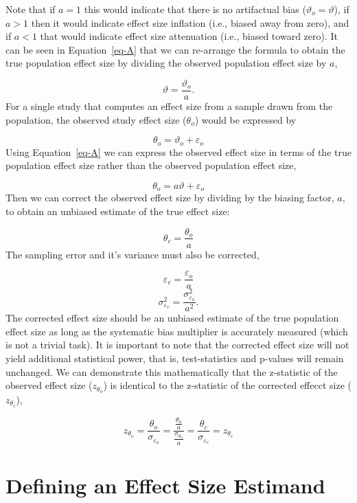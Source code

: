 \documentclass[
  letterpaper,
  DIV=11,
  numbers=noendperiod]{scrreprt}
\begin{document}
Note that if \(a=1\) this would indicate that there is no artifactual
bias (\(\vartheta_o=\vartheta\)), if \(a>1\) then it would indicate
effect size inflation (i.e., biased away from zero), and if \(a<1\) that
would indicate effect size attenuation (i.e., biased toward zero). It
can be seen in Equation~\ref{eq-A} that we can re-arrange the formula to
obtain the true population effect size by dividing the observed
population effect size by \(a\),

\[
\vartheta = \frac{\vartheta_o}{a}.
\] For a single study that computes an effect size from a sample drawn
from the population, the observed study effect size (\(\theta_o\)) would
be expressed by

\[
\theta_o = \vartheta_o + \varepsilon_o
\] Using Equation~\ref{eq-A} we can express the observed effect size in
terms of the true population effect size rather than the observed
population effect size,

\[
\theta_o = a\vartheta + \varepsilon_o
\] Then we can correct the observed effect size by dividing by the
biasing factor, \(a\), to obtain an unbiased estimate of the true effect
size:

\[
\theta_c = \frac{\theta_o}{a}
\] The sampling error and it's variance must also be corrected,

\[
\varepsilon_c = \frac{\varepsilon_o}{a}
\] \[
\sigma_{\varepsilon_c}^2 = \frac{\sigma^2_{\varepsilon_o}}{a^2}.
\] The corrected effect size should be an unbiased estimate of the true
population effect size as long as the systematic bias multiplier is
accurately measured (which is not a trivial task). It is important to
note that the corrected effect size will not yield additional
statistical power, that is, test-statistics and p-values will remain
unchanged. We can demonstrate this mathematically that the z-statistic
of the observed effect size (\(z_{\theta_o}\)) is identical to the
z-statistic of the corrected effecct size (\(z_{\theta_c}\)),

\[
z_{\theta_o} = \frac{\theta_o}{\sigma_{\varepsilon_o}} = \frac{\frac{\theta_o}{a}}{\frac{\sigma_{\theta_o}}{a}} = \frac{\theta_c}{\sigma_{\varepsilon_c}} = z_{\theta_c}
\]

\hypertarget{defining-an-effect-size-estimand}{%
\section{Defining an Effect Size
Estimand}\label{defining-an-effect-size-estimand}}
\end{document}

